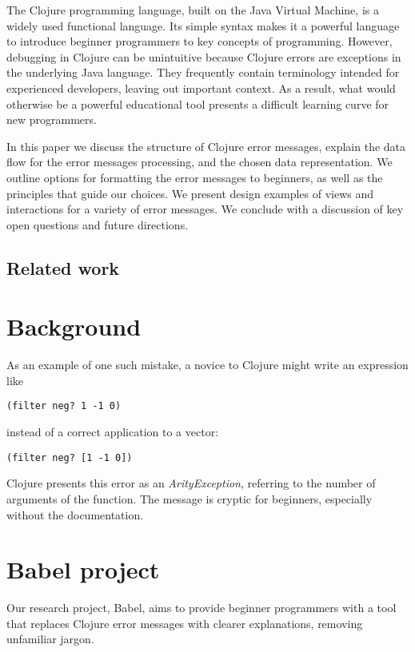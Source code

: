 \documentclass[12pt]{article}
\begin{document}
The Clojure programming language, built on the Java Virtual Machine, is a widely used functional language. Its simple syntax makes it a powerful language to introduce beginner programmers to key concepts of programming. However, debugging in Clojure can be unintuitive because Clojure errors are exceptions in the underlying Java language. They frequently contain terminology intended for experienced developers, leaving out important context. As a result, what would otherwise be a powerful educational tool presents a difficult learning curve for new programmers.

In this paper we discuss the structure of Clojure error messages, explain the data flow for the error messages processing, and the chosen data representation. We outline options for formatting the error messages to beginners, as well as the principles that guide our choices. We present design examples of views and interactions for a variety of error messages. We conclude with a discussion of key open questions and future directions. 

\subsection{Related work}\label{subsec:related}

\section{Background}\label{sec:background}

As an example of one such mistake, a novice to Clojure might write an expression like
\begin{verbatim}
(filter neg? 1 -1 0)
\end{verbatim}
instead of a correct application to a vector:
\begin{verbatim}
(filter neg? [1 -1 0])
\end{verbatim}
 Clojure presents this error as an {\it ArityException}, referring to the number of arguments of the function. The message is cryptic for beginners, especially without the documentation.

\section{Babel project}\label{sec:babel}

Our research project, Babel, aims to provide beginner programmers with a tool that replaces Clojure error messages with clearer explanations, removing unfamiliar jargon.
\end{document}
